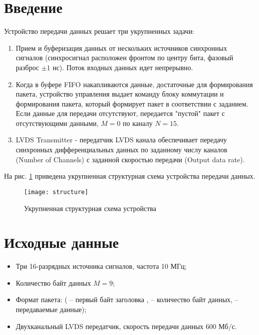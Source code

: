 





\tableofcontents
\lstlistoflistings
\listoffigures
\newpage

\section{Введение}

Устройство передачи данных решает три укрупненных задачи:
\begin{enumerate}
	\item Прием и буферизация данных от нескольких источников синхронных сигналов (синхросигнал расположен фронтом по центру бита, фазовый разброс $\pm1$ нс). Поток входных данных идет непрерывно.
	\item Когда в буфере FIFO накапливаются данные, достаточные для формирования пакета, устройство управления выдает команду блоку коммутации и формирования пакета, который формирует пакет в соответствии с заданием. Если данные для передачи отсутствуют, передается "пустой" пакет с отсутствующими данными, $M=0$ по каналу $N=15$.
	\item LVDS Transmitter - передатчик LVDS канала обеспечивает передачу синхронных дифференциальных данных по заданному числу каналов (Number of Channels) с заданной скоростью передачи (Output data rate).
\end{enumerate}

На рис. \ref{fig:structure} приведена укрупненная структурная схема устройства передачи данных.
\begin{figure}[H]
	\centering
	\texttt{[image: structure]}
	\caption{Укрупненная структурная схема устройства}
	\label{fig:structure}
\end{figure}

\section{Исходные данные}

\begin{itemize}
	\item Три 16-разрядных источника сигналов, частота 10 МГц;
	\item Количество байт данных $M = 9$;
	\item Формат пакета:  ( -- первый байт заголовка ,  -- количество байт данных,  -- передаваемые данные);
 	\item Двухканальный LVDS передатчик, скорость передачи данных $600$ Мб/с.
\end{itemize}

